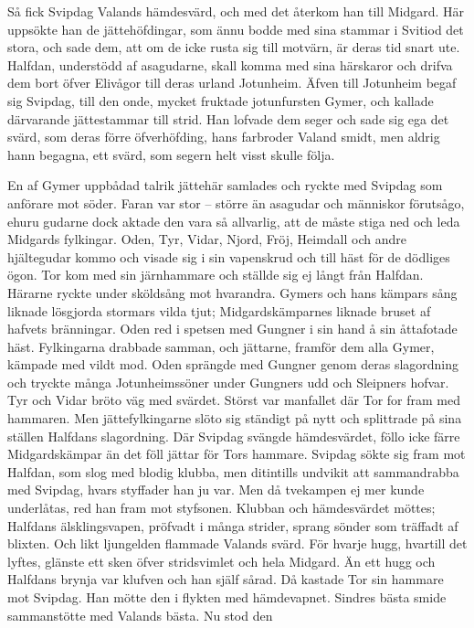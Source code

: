Så fick Svipdag Valands hämdesvärd, och med det återkom han till
Midgard. Här uppsökte han de jättehöfdingar, som ännu bodde med sina
stammar i Svitiod det stora, och sade dem, att om de icke rusta sig till
motvärn, är deras tid snart ute. Halfdan, understödd af asagudarne,
skall komma med sina härskaror och drifva dem bort öfver Elivågor till
deras urland Jotunheim. Äfven till Jotunheim begaf sig Svipdag, till den
onde, mycket fruktade jotunfursten Gymer, och kallade därvarande
jättestammar till strid. Han lofvade dem seger och sade sig ega det
svärd, som deras förre
öfverhöfding,
hans farbroder Valand smidt, men aldrig hann begagna, ett svärd, som
segern helt visst skulle följa.

En af Gymer uppbådad talrik jättehär samlades och ryckte med Svipdag som
anförare mot söder. Faran var stor -- större än asagudar och människor
förutsågo, ehuru gudarne dock aktade den vara så allvarlig, att de måste
stiga ned och leda Midgards fylkingar. Oden, Tyr, Vidar, Njord, Fröj,
Heimdall och andre hjältegudar kommo och visade sig i sin vapenskrud och
till häst för de dödliges ögon. Tor kom med sin järnhammare och ställde
sig ej långt från Halfdan. Härarne ryckte under sköldsång mot hvarandra.
Gymers och hans kämpars sång liknade lösgjorda stormars vilda tjut;
Midgardskämparnes liknade bruset af hafvets bränningar. Oden red i
spetsen med Gungner i sin hand å sin åttafotade häst. Fylkingarna
drabbade samman, och jättarne, framför dem alla Gymer, kämpade med vildt
mod. Oden sprängde med Gungner genom deras slagordning och tryckte många
Jotunheimssöner under Gungners udd och Sleipners hofvar. Tyr och Vidar
bröto väg med svärdet. Störst var manfallet där Tor for fram med
hammaren. Men jättefylkingarne slöto sig ständigt på nytt och splittrade
på sina ställen Halfdans slagordning. Där Svipdag svängde hämdesvärdet,
föllo icke färre Midgardskämpar än det föll jättar för Tors hammare.
Svipdag sökte sig fram mot Halfdan, som slog med blodig klubba, men
ditintills undvikit att sammandrabba med Svipdag, hvars styffader han ju
var. Men då tvekampen ej mer kunde underlåtas, red han fram mot
styfsonen. Klubban och hämdesvärdet möttes; Halfdans älsklingsvapen,
pröfvadt i många strider, sprang sönder som träffadt af blixten. Och
likt ljungelden flammade Valands svärd. För hvarje hugg, hvartill det
lyftes, glänste ett sken öfver stridsvimlet och hela Midgard. Än ett
hugg och Halfdans brynja var klufven och han själf sårad. Då kastade Tor
sin hammare mot Svipdag. Han mötte den i flykten med hämdevapnet.
Sindres bästa smide sammanstötte med Valands bästa. Nu stod den
